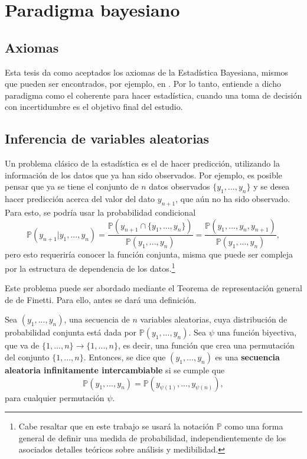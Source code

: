 \chapter[Paradigma bayesiano]{Paradigma bayesiano\raisebox{.3\baselineskip}{\normalsize\footnotemark}}


\section{Axiomas}
Esta tesis da como aceptados los axiomas de la Estad\'istica Bayesiana, mismos que pueden ser encontrados, por ejemplo, en \cite{Fishburn_Axioms}. Por lo tanto, entiende a dicho paradigma como el coherente para hacer estad\'istica, cuando una toma de decisi\'on con incertidumbre es el objetivo final del estudio. 

\section{Inferencia de variables aleatorias}

Un problema clásico de la estad\'istica es el de hacer predicci\'on, utilizando la informaci\'on de los datos que ya han sido observados. Por ejemplo, es posible pensar que ya se tiene el conjunto de $n$ datos observados $\{y_1, ..., y_n\}$ y se desea hacer predicci\'on acerca del valor del dato $y_{n+1}$, que a\'un no ha sido observado. Para esto, se podr\'ia usar la probabilidad condicional
\begin{equation*}
    \mathbb{P}(y_{n+1}|y_1,...,y_n) =
    \frac{\mathbb{P}(y_{n+1} \cap \{y_1, ..., y_n\})}{\mathbb{P}(y_1, ..., y_n)} =
    \frac{\mathbb{P}(y_1, ..., y_n,y_{n+1})}{\mathbb{P}(y_1, ..., y_n)},
\end{equation*}
pero esto requerir\'ia conocer la funci\'on conjunta, misma que puede ser compleja por la estructura de dependencia de los datos.\footnote{Cabe resaltar que en este trabajo se usar\'a la notaci\'on $\mathbb{P}$ como una forma general de definir una medida de probabilidad, independientemente de los asociados detalles te\'oricos sobre an\'alisis y medibilidad.}

Este problema puede ser abordado mediante el Teorema de representaci\'on general de de Finetti. Para ello, antes se dar\'a una definici\'on.

\begin{defin*}
    Sea $(y_1,...,y_n)$, una secuencia de $n$ variables aleatorias, cuya distribuci\'on de probabilidad conjunta est\'a dada por $\mathbb{P}(y_1,...,y_n)$. Sea $\psi$ una funci\'on biyectiva, que va de $\{1,...,n\} \rightarrow \{1,...,n\}$, es decir, una funci\'on que crea una permutaci\'on del conjunto $\{1,...,n\}$.  
    Entonces, se dice que $(y_1,...,y_n)$ es una \textbf{secuencia aleatoria infinitamente intercambiable} si se cumple que 
    \begin{equation*}
        \mathbb{P}(y_1,...,y_n) = \mathbb{P}(y_{\psi(1)},...,y_{\psi(n)}),
    \end{equation*}
    para cualquier permutaci\'on $\psi$.
\end{defin*}


